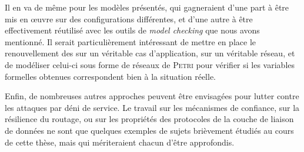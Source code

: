 Il en va de même pour les modèles présentés, qui gagneraient d'une part à être mis en œuvre sur des configurations différentes, et d'une autre à être effectivement réutilisé avec les outils de \textit{model checking} que nous avons mentionné.
Il serait particulièrement intéressant de mettre en place le renouvellement des \cnst sur un véritable cas d'application, sur un véritable réseau, et de modéliser celui-ci sous forme de réseaux de \textsc{Petri} pour vérifier si les variables formelles obtenues correspondent bien à la situation réelle.

Enfin, de nombreuses autres approches peuvent être envisagées pour lutter contre les attaques par déni de service.
Le travail sur les mécanismes de confiance, sur la résilience du routage, ou sur les propriétés des protocoles de la couche de liaison de données ne sont que quelques exemples de sujets brièvement étudiés au cours de cette thèse, mais qui mériteraient chacun d'être approfondis.
